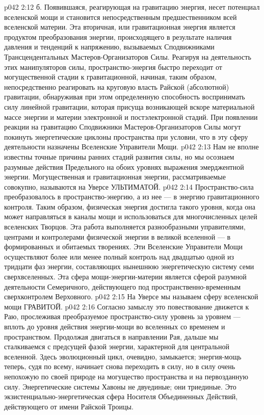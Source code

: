 \vs p042 2:12 \pc б.  Появившаяся, реагирующая на гравитацию энергия, несет потенциал вселенской мощи и становится непосредственным предшественником всей вселенской материи. Эта вторичная, или гравитационная энергия является продуктом преобразования энергии, происходящего в результате наличия давления и тенденций к напряжению, вызываемых Сподвижниками Трансцендентальных Мастеров\hyp{}Организаторов Силы. Реагируя на деятельность этих манипуляторов силы, пространство\hyp{}энергия быстро переходит от могущественной стадии к гравитационной, начиная, таким образом, непосредственно реагировать на круговую власть Райской (абсолютной) гравитации, обнаруживая при этом определенную способность воспринимать силу линейной гравитации, которая присуща возникающей вскоре материальной массе энергии и материи электронной и постэлектронной стадий. При появлении реакции на гравитацию Сподвижники Мастеров\hyp{}Организаторов Силы могут покинуть энергетические циклоны пространства при условии, что в эту сферу деятельности назначены Вселенские Управители Мощи.
\vs p042 2:13 \pc Нам не вполне известны точные причины ранних стадий развития силы, но мы осознаем разумные действия Предельного на обоих уровнях выражения эмерджентной энергии. Могущественная и гравитационная энергии, рассматриваемые совокупно, называются на Уверсе УЛЬТИМАТОЙ.
\vs p042 2:14 \pc {}\bibnobreakspace {} Пространство\hyp{}сила преобразовалось в пространство\hyp{}энергию, а из нее --- в энергию гравитационного контроля. Таким образом, физическая энергия достигла такого уровня, когда она может направляться в каналы мощи и использоваться для многочисленных целей вселенских Творцов. Эта работа выполняется разнообразными управителями, центрами и контролерами физической энергии в великой вселенной --- в формированных и обитаемых творениях. Эти Вселенские Управители Мощи осуществляют более или менее полный контроль над двадцатью одной из тридцати фаз энергии, составляющих нынешнюю энергетическую систему семи сверхвселенных. Эта сфера мощи\hyp{}энергии\hyp{}материи является сферой разумной деятельности Семеричного, действующего под пространственно\hyp{}временным сверхконтролем Верховного.
\vs p042 2:15 На Уверсе мы называем сферу вселенской мощи ГРАВИТОЙ.
\vs p042 2:16 \pc {}\bibnobreakspace {} Согласно замыслу это повествование движется к Раю, прослеживая преобразуемое пространство\hyp{}силу уровень за уровнем --- вплоть до уровня действия энергии\hyp{}мощи во вселенных со временем и пространством. Продолжая двигаться в направлении Рая, дальше мы сталкиваемся с предсущей фазой энергии, характерной для центральной вселенной. Здесь эволюционный цикл, очевидно, замыкается; энергия\hyp{}мощь теперь, судя по всему, начинает снова переходить в силу, но в силу очень непохожую по своей природе на могущество пространства и на первозданную силу. Энергетические системы Хавоны не двуединые; они триединые. Это экзистенциально\hyp{}энергетическая сфера Носителя Объединенных Действий, действующего от имени Райской Троицы.

